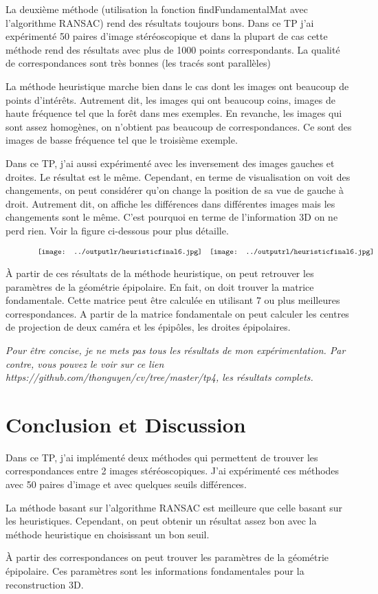 \documentclass[french,12pt,a4paper,oneside,notitlepage]{report}
\begin{document}
La deuxième méthode (utilisation la fonction findFundamentalMat avec l'algorithme RANSAC) 
rend des résultats toujours bons. Dans ce TP j'ai expérimenté 50 paires d'image 
stéréoscopique et dans la plupart de cas cette méthode rend des résultats avec plus de 
1000 points correspondants. La qualité de correspondances sont très bonnes (les tracés 
sont parallèles)

La méthode heuristique marche bien dans le cas dont les images ont beaucoup de points 
d'intérêts. Autrement dit, les images qui ont beaucoup coins, images de haute fréquence 
tel que la forêt dans mes exemples. En revanche, les images qui sont assez homogènes, on 
n'obtient pas beaucoup de correspondances. Ce sont des images de basse fréquence tel que 
le troisième exemple.

Dans ce TP, j'ai aussi expérimenté avec les inversement des images gauches et droites. 
Le résultat est le même. Cependant, en terme de visualisation on voit des changements, on 
peut considérer qu'on change la position de sa vue de gauche à droit. Autrement dit, on 
affiche les différences dans différentes images mais les changements sont le même. C'est 
pourquoi en terme de l'information 3D on ne perd rien. Voir la figure ci-dessous pour 
plus détaille.

 \begin{figure}[ht]
	\begin{center}$
		\begin{array}[h]{cc}
		  \texttt{[image: ../outputlr/heuristicfinal6.jpg]}&
		  \texttt{[image: ../outputrl/heuristicfinal6.jpg]}
		\end{array}$
	\end{center}
\end{figure}

À partir de ces résultats de la méthode heuristique, on peut retrouver les paramètres de 
la géométrie épipolaire. En fait, on doit trouver la matrice fondamentale. Cette matrice 
peut être calculée en utilisant 7 ou plus meilleures correspondances. A partir de la 
matrice fondamentale on peut calculer les centres de projection de deux caméra et les 
épipôles, les droites épipolaires. 

\textit{Pour être concise, je ne mets pas tous les résultats de mon expérimentation. Par 
contre, vous pouvez le voir sur ce lien https://github.com/thonguyen/cv/tree/master/tp4, 
les résultats complets.}
\section{Conclusion et Discussion}
Dans ce TP, j'ai implémenté deux méthodes qui permettent de trouver les correspondances 
entre 2 images stéréoscopiques. J'ai expérimenté ces méthodes avec 50 paires d'image et 
avec quelques seuils différences. 

La méthode basant sur l'algorithme RANSAC est meilleure que celle basant sur les 
heuristiques. Cependant, on peut obtenir un résultat assez bon avec la méthode 
heuristique en choisissant un bon seuil.

À partir des correspondances on peut trouver les paramètres de la géométrie épipolaire. 
Ces paramètres sont les informations fondamentales pour la reconstruction 3D.
\end{document}
